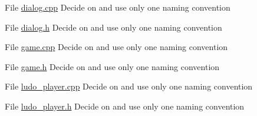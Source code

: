 
\begin{DoxyRefList}
\item[File \mbox{\hyperlink{dialog_8cpp}{dialog.cpp}} ]\label{todo__todo000001}%
%
Decide on and use only one naming convention  
\item[File \mbox{\hyperlink{dialog_8h}{dialog.h}} ]\label{todo__todo000004}%
%
Decide on and use only one naming convention  
\item[File \mbox{\hyperlink{game_8cpp}{game.cpp}} ]\label{todo__todo000002}%
%
Decide on and use only one naming convention  
\item[File \mbox{\hyperlink{game_8h}{game.h}} ]\label{todo__todo000005}%
%
Decide on and use only one naming convention  
\item[File \mbox{\hyperlink{ludo__player_8cpp}{ludo\+\_\+player.cpp}} ]\label{todo__todo000003}%
%
Decide on and use only one naming convention  
\item[File \mbox{\hyperlink{ludo__player_8h}{ludo\+\_\+player.h}} ]\label{todo__todo000006}%
%
Decide on and use only one naming convention 
\end{DoxyRefList}